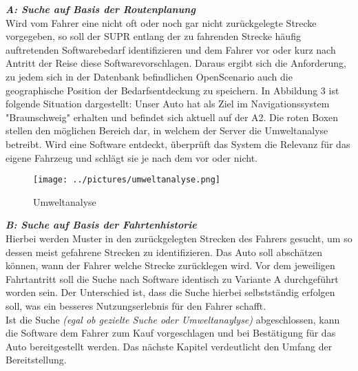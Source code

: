 \textbf{\textit{A: Suche auf Basis der Routenplanung}}\\
Wird vom Fahrer eine nicht oft oder noch gar nicht zurückgelegte Strecke vorgegeben, so soll der SUPR entlang der zu fahrenden Strecke häufig auftretenden Softwarebedarf identifizieren und dem Fahrer vor oder kurz nach Antritt der Reise diese Softwarevorschlagen. Daraus ergibt sich die Anforderung, zu jedem sich in der Datenbank befindlichen OpenScenario auch die geographische Position der Bedarfsentdeckung zu speichern. In Abbildung 3 ist folgende Situation dargestellt: Unser Auto hat als Ziel im Navigationssystem "Braunschweig" erhalten und befindet sich aktuell auf der A2. Die roten Boxen stellen den möglichen Bereich dar, in welchem der Server die Umweltanalyse betreibt. Wird eine Software entdeckt, überprüft das System die Relevanz für das eigene Fahrzeug und schlägt sie je nach dem vor oder nicht.
\begin{figure}[H]
	\centering
	\texttt{[image: ../pictures/umweltanalyse.png]}
	\caption{Umweltanalyse}
\end{figure}

\textit{\textbf{B: Suche auf Basis der Fahrtenhistorie}}\\
Hierbei werden Muster in den zurückgelegten Strecken des Fahrers gesucht, um so dessen meist gefahrene Strecken zu identifizieren. Das Auto soll abschätzen können, wann der Fahrer welche Strecke zurücklegen wird. Vor dem jeweiligen Fahrtantritt soll die Suche nach Software identisch zu Variante A durchgeführt worden sein. Der Unterschied ist, dass die Suche hierbei selbstständig erfolgen soll, was ein besseres Nutzungserlebnis für den Fahrer schafft.\\

Ist die Suche \textit{(egal ob gezielte Suche oder Umweltanaylyse)} abgeschlossen, kann die Software dem Fahrer zum Kauf vorgeschlagen und bei Bestätigung für das Auto bereitgestellt werden. Das nächste Kapitel verdeutlicht den Umfang der Bereitstellung.